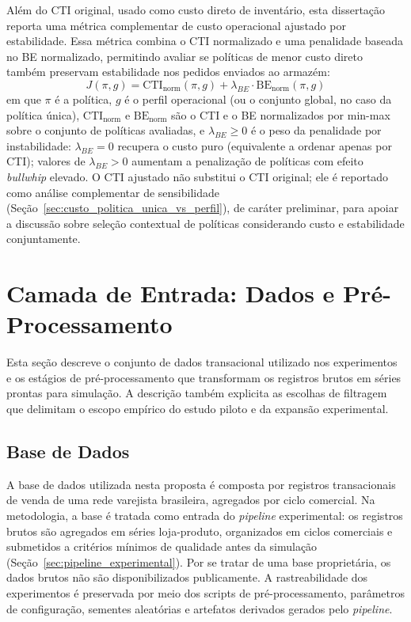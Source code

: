 Além do CTI original, usado como custo direto de inventário, esta dissertação reporta uma métrica complementar de custo operacional ajustado por estabilidade. Essa métrica combina o CTI normalizado e uma penalidade baseada no BE normalizado, permitindo avaliar se políticas de menor custo direto também preservam estabilidade nos pedidos enviados ao armazém:
\begin{equation}
J(\pi, g) = \mathrm{CTI}_{\text{norm}}(\pi, g) + \lambda_{BE} \cdot \mathrm{BE}_{\text{norm}}(\pi, g)
\end{equation}
em que $\pi$ é a política, $g$ é o perfil operacional (ou o conjunto global, no caso da política única), $\mathrm{CTI}_{\text{norm}}$ e $\mathrm{BE}_{\text{norm}}$ são o CTI e o BE normalizados por min-max sobre o conjunto de políticas avaliadas, e $\lambda_{BE} \geq 0$ é o peso da penalidade por instabilidade: $\lambda_{BE}=0$ recupera o custo puro (equivalente a ordenar apenas por CTI); valores de $\lambda_{BE} > 0$ aumentam a penalização de políticas com efeito \textit{bullwhip} elevado. O CTI ajustado não substitui o CTI original; ele é reportado como análise complementar de sensibilidade (Seção~\ref{sec:custo_politica_unica_vs_perfil}), de caráter preliminar, para apoiar a discussão sobre seleção contextual de políticas considerando custo e estabilidade conjuntamente.

\section{Camada de Entrada: Dados e Pré-Processamento}

Esta seção descreve o conjunto de dados transacional utilizado nos experimentos e os estágios de pré-processamento que transformam os registros brutos em séries prontas para simulação. A descrição também explicita as escolhas de filtragem que delimitam o escopo empírico do estudo piloto e da expansão experimental.

\subsection{Base de Dados}

A base de dados utilizada nesta proposta é composta por registros transacionais de venda de uma rede varejista brasileira, agregados por ciclo comercial. Na metodologia, a base é tratada como entrada do \textit{pipeline} experimental: os registros brutos são agregados em séries loja-produto, organizados em ciclos comerciais e submetidos a critérios mínimos de qualidade antes da simulação (Seção~\ref{sec:pipeline_experimental}). Por se tratar de uma base proprietária, os dados brutos não são disponibilizados publicamente. A rastreabilidade dos experimentos é preservada por meio dos scripts de pré-processamento, parâmetros de configuração, sementes aleatórias e artefatos derivados gerados pelo \textit{pipeline}.

